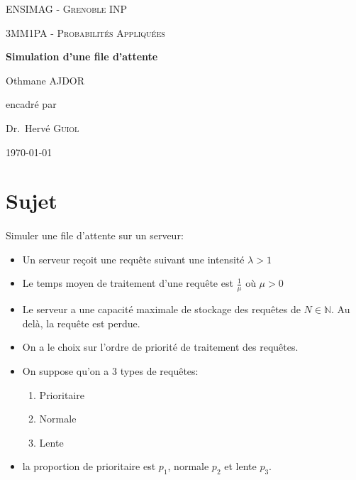 \documentclass[12pt,a4paper]{article}
\begin{document}
    \begin{titlepage}
        \centering
        {\scshape\LARGE ENSIMAG - Grenoble INP \par}
        \vspace{1cm}
        {\scshape\Large 3MM1PA - Probabilités Appliquées\par}
        \vspace{1.5cm}
        {\huge\bfseries Simulation d'une file d'attente\par}
        \vspace{2cm}
        {\Large Othmane AJDOR\par}
        \vfill
        encadré par\par
        Dr.~Hervé \textsc{Guiol}
    
        \vfill
    
    
        {\large \today\par}
    \end{titlepage}
    
    \tableofcontents
    
    \newpage
        \section*{Sujet}
        \paragraph{}
        Simuler une file d'attente sur un serveur:
        \begin{itemize}
            \item Un serveur reçoit une requête suivant une intensité $\lambda > 1$
            \item Le temps moyen de traitement d'une requête est $\frac{1}{\mu}$ où $\mu > 0$
            \item Le serveur a une capacité maximale de stockage des requêtes de \linebreak $N \in \mathbb{N}$. 
             Au delà, la requête est perdue.
            \item On a le choix sur l'ordre de priorité de traitement des requêtes.
            \item On suppose qu'on a 3 types de requêtes:
                \begin{enumerate}
                    \item Prioritaire
                    \item Normale
                    \item Lente
                \end{enumerate}
            \item la proportion de prioritaire est $p_1$, normale $p_2$ et lente $p_3$.
        \end{itemize}
    
\end{document}
